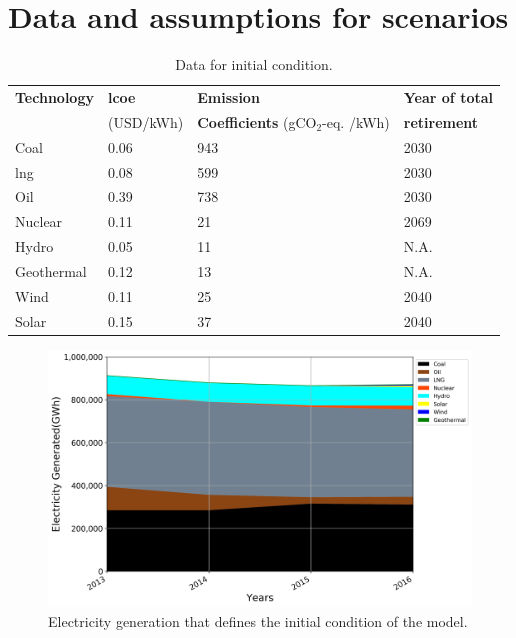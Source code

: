 \section{Data and assumptions for scenarios} \label{Appendix}

\begin{table}[!ht]
	\caption{Data for initial condition.}
	\vspace{0.1in}
	\begin{tabularx}{1.2\textwidth}{p{} p{} p{} p{}}
		\hline
\textbf{Technology} & \textbf{\gls{lcoe}} \cite{lazard_lazards_2016} & \textbf{Emission} & \textbf{Year of total}\\
  & (USD/kWh) & \textbf{Coefficients} \cite{the_federation_of_electric_power_companies_of_japan_electricity_2019} (gCO$_2$-eq. /kWh) & \textbf{retirement} \\
\hline
Coal & 0.06 & 943 & 2030 \\
\gls{lng} & 0.08 & 599 & 2030 \\
Oil & 0.39 & 738 & 2030 \\
Nuclear & 0.11 & 21 & 2069 \\
Hydro & 0.05 & 11 & N.A. \\
Geothermal & 0.12 & 13 & N.A. \\
Wind & 0.11 & 25 & 2040 \\
Solar & 0.15 & 37 & 2040 \\
\hline 
\end{tabularx}
\label{init-eco}
\end{table}

\begin{figure}[h] 
\centering
\label{ic-elc}
\includegraphics[scale=0.5]{figures/IC}
\caption{Electricity generation that defines the initial condition of the model.}
\end{figure}

